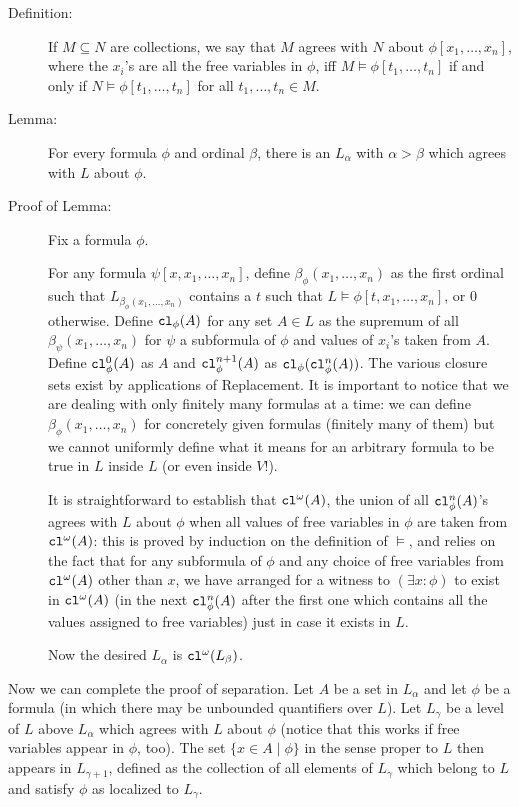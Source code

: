 \documentclass[12pt]{book}
\begin{document}
\begin{description}
\begin{description}
\item[Definition:]  If $M \subseteq N$ are collections, we say that $M$ agrees with $N$ about $\phi[x_1,\ldots,x_n]$, where the $x_i$'s are all the free variables in $\phi$,
iff $M \models \phi[t_1,\ldots,t_n]$ if and only if $N \models \phi[t_1,\ldots,t_n]$ for all $t_1,\ldots, t_n \in M$.

\item[Lemma:]  For every formula $\phi$ and ordinal $\beta$, there is an $L_{\alpha}$ with $\alpha>\beta$ which agrees with $L$ about $\phi$.

\item[Proof of Lemma:] Fix a formula $\phi$.

 For any formula $\psi[x,x_1,\ldots,x_n]$, define $\beta_{\phi}(x_1,\ldots,x_n)$ as the first ordinal such that $L_{\beta_{\phi}(x_1,\ldots,x_n)}$ contains a $t$
such that $L \models \phi[t,x_1,\ldots,x_n]$, or 0 otherwise.  Define ${\tt cl}_{\phi}(A)$ for any set $A \in L$ as the supremum of all $\beta_{\psi}(x_1,\ldots,x_n)$ for $\psi$ a subformula of $\phi$
and values of $x_i$'s taken from $A$.  Define ${\tt cl}_{\phi}^0(A)$ as $A$ and ${\tt cl}_{\phi}^{n+1}(A)$ as ${\tt cl}_{\phi}({\tt cl}^n_{\phi}(A))$.  The various closure sets exist by applications of Replacement.  It is important to notice that we are dealing with only finitely many formulas at a time:  we can define $\beta_{\phi}(x_1,\ldots,x_n)$  for concretely given formulas (finitely many of them) but we cannot uniformly define what it means for an arbitrary formula to be true in $L$ inside $L$ (or even inside $V$!).

It is straightforward to establish that ${\tt cl}^{\omega}(A)$, the union of all ${\tt cl}^n_{\phi}(A)$'s agrees with $L$ about $\phi$ when all values of free variables in $\phi$ are
taken from ${\tt cl}^{\omega}(A)$:  this is proved by induction on the definition of $\models$, and relies on the fact that for any subformula of $\phi$ and any choice of free variables
from ${\tt cl}^{\omega}(A)$ other than $x$, we have arranged for a witness to $(\exists x:\phi)$ to exist in ${\tt cl}^{\omega}(A)$ (in the next ${\tt cl}^n_{\phi}(A)$ after the first one which contains all the values assigned to free variables) just in case it exists in $L$.

Now the desired $L_{\alpha}$ is ${\tt cl}^{\omega}(L_{\beta})$.

\end{description}


Now we can complete the proof of separation.  Let $A$ be a set in $L_{\alpha}$ and let $\phi$ be a formula (in which there may be unbounded quantifiers over $L$).  Let
$L_{\gamma}$ be a level of $L$ above $L_{\alpha}$ which agrees with $L$ about $\phi$ (notice that this works if free variables appear in $\phi$, too).  The set $\{x \in A\mid \phi\}$
in the sense proper to $L$ then appears in $L_{\gamma+1}$, defined as the collection of all elements of $L_{\gamma}$ which belong to $L$ and satisfy $\phi$ as localized to $L_{\gamma}$.


\end{description}
\end{document}
